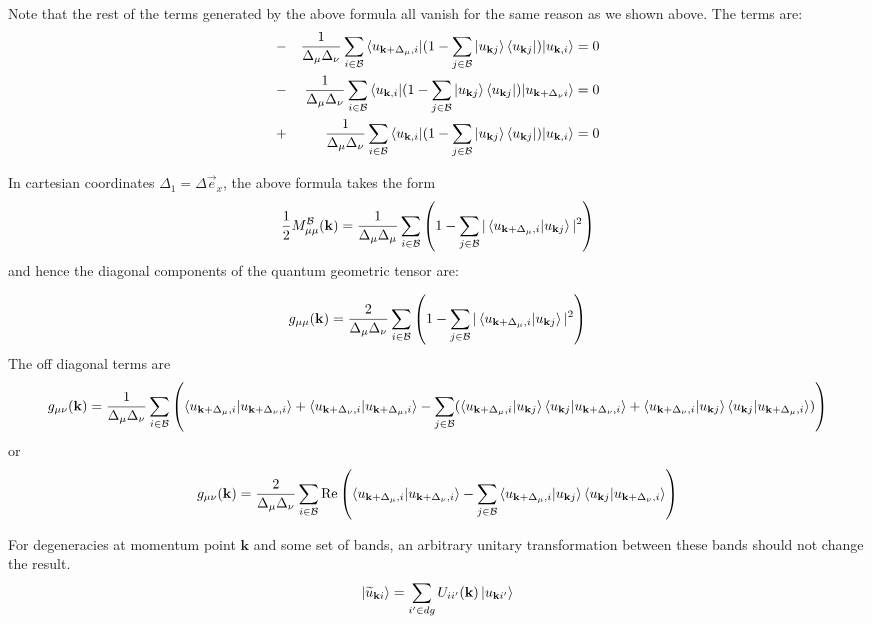 \documentclass[onecolumn, prb,preprintnumbers,amsmath,amssymb,floatfix]{revtex4}
\newcommand{\vk}{{\mathbf{k}}}
\newcommand{\cb}{{\cal B}}
\begin{document}
Note that the rest of the terms generated by the above formula all vanish for the same reason as we shown above. The terms are:
\begin{eqnarray}
&-&  \frac{1}{\Delta_\mu\Delta_\nu}\sum_{i\in \cb}\braket{ u_{\vk+\Delta_\mu,i}|(1-\sum_{j\in \cb}\ket{u_{\vk j}}\bra{u_{\vk j}})|u_{\vk,i}}=0\\
&-&  \frac{1}{\Delta_\mu\Delta_\nu}\sum_{i\in \cb}\braket{ u_{\vk,i}|(1-\sum_{j\in \cb}\ket{u_{\vk j}}\bra{u_{\vk j}})|u_{\vk+\Delta_\nu i}}=0\\
&+&  \frac{1}{\Delta_\mu\Delta_\nu}\sum_{i\in \cb}\braket{u_{\vk,i}|(1-\sum_{j\in \cb}\ket{u_{\vk j}}\bra{u_{\vk j}})|u_{\vk,i}}=0
\end{eqnarray}

In cartesian coordinates $\Delta_1=\Delta \vec{e}_{x}$, the above formula takes the form
\begin{eqnarray}
\frac{1}{2} M_{\mu\mu}^{\cb}(\vk)  =
  \frac{1}{\Delta_\mu\Delta_\mu}\sum_{i \in\cb}
  \left(1  -\sum_{j\in\cb} |\braket{ u_{\vk+\Delta_\mu,i}|u_{\vk j}}|^2\right)
\end{eqnarray}
and hence the diagonal components of the quantum geometric tensor are:

\begin{eqnarray}
g_{\mu\mu}(\vk)  =
  \frac{2}{\Delta_\mu\Delta_\nu}\sum_{i \in \cb}
  \left(1  -\sum_{j\in\cb} |\braket{ u_{\vk+\Delta_\mu,i}|u_{\vk j}}|^2\right)
\label{Eq:20}
\end{eqnarray}
The off diagonal terms are
\begin{eqnarray}
g_{\mu\nu}(\vk)  =
  \frac{1}{\Delta_\mu\Delta_\nu}\sum_{i \in\cb}
  \left(
    \braket{u_{\vk+\Delta_\mu,i}|u_{\vk+\Delta_\nu,i}}
  +\braket{u_{\vk+\Delta_\nu,i}|u_{\vk+\Delta_\mu,i}}
  -\sum_{j\in\cb}
  (\braket{ u_{\vk+\Delta_\mu,i}|u_{\vk j}}\braket{u_{\vk j}| u_{\vk+\Delta_\nu,i}}+
  \braket{ u_{\vk+\Delta_\nu,i}|u_{\vk j}}\braket{u_{\vk j}| u_{\vk+\Delta_\mu,i}})
  \right)
\end{eqnarray}
or
\begin{eqnarray}
g_{\mu\nu}(\vk)  =
  \frac{2}{\Delta_\mu\Delta_\nu}\sum_{i \in\cb}
  \textrm{Re}\left(
    \braket{u_{\vk+\Delta_\mu,i}|u_{\vk+\Delta_\nu,i}}
  -\sum_{j\in\cb}
  \braket{ u_{\vk+\Delta_\mu,i}|u_{\vk j}}\braket{u_{\vk j}| u_{\vk+\Delta_\nu,i}}
  \right)
\end{eqnarray}

For degeneracies at momentum point $\vk$ and some set of bands, an arbitrary unitary transformation between these bands should not change the result.
$$\ket{\widetilde{u}_{\vk i}} = \sum_{i'\in dg}U_{i i'}(\vk) \ket{u_{\vk i'}} $$
\end{document}
